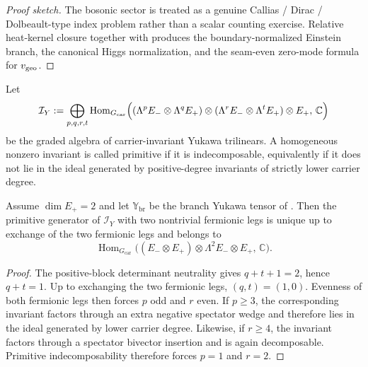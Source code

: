 \begin{proof}[Proof sketch]
The bosonic sector is treated as a genuine Callias / Dirac / Dolbeault-type index problem rather
than a scalar counting exercise. Relative heat-kernel closure together with
produces the boundary-normalized Einstein branch, the canonical Higgs normalization, and the
seam-even zero-mode formula for $v_{\mathrm{geo}}$.
\end{proof}

\begin{definition}
\label{def:primitive-yukawa-generator}
Let
\[
\mathcal I_Y
:=
\bigoplus_{p,q,r,t}
\operatorname{Hom}_{G_{\mathrm{car}}}
\Bigl(
(\Lambda^p E_-\otimes \Lambda^q E_+)
\otimes
(\Lambda^r E_-\otimes \Lambda^t E_+)
\otimes E_+,\,
\mathbb C
\Bigr)
\]
be the graded algebra of carrier-invariant Yukawa trilinears. A homogeneous nonzero invariant is
called primitive if it is indecomposable, equivalently if it does not lie in the ideal generated by
positive-degree invariants of strictly lower carrier degree.
\end{definition}

\begin{lemma}
\label{lem:lowest-primitive-yukawa-generator}
Assume $\dim E_+=2$ and let $\mathbb Y_{\mathrm{br}}$ be the branch Yukawa tensor of
. Then the primitive generator of
$\mathcal I_Y$ with two nontrivial fermionic legs is unique up to exchange of the two fermionic
legs and belongs to
\[
\operatorname{Hom}_{G_{\mathrm{car}}}
\bigl((E_-\otimes E_+)\otimes \Lambda^2 E_-\otimes E_+,\,\mathbb C\bigr).
\]
\end{lemma}

\begin{proof}
The positive-block determinant neutrality gives $q+t+1=2$, hence $q+t=1$. Up to exchanging the two
fermionic legs, $(q,t)=(1,0)$. Evenness of both fermionic legs then forces $p$ odd and $r$ even.
If $p\ge 3$, the corresponding invariant factors through an extra negative spectator wedge and
therefore lies in the ideal generated by lower carrier degree. Likewise, if $r\ge 4$, the
invariant factors through a spectator bivector insertion and is again decomposable. Primitive
indecomposability therefore forces $p=1$ and $r=2$.
\end{proof}

